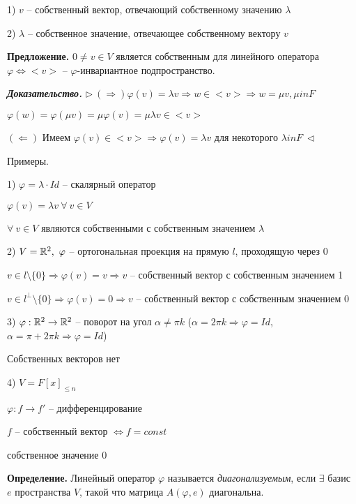 1) $v$ -- собственный вектор, отвечающий собственному значению $\lambda$

2) $\lambda$ -- собственное значение, отвечающее собственному вектору $v$

\vspace{\baselineskip}
\textbf{Предложение.} $0 \neq v \in V$ является собственным для линейного оператора $\varphi \Leftrightarrow <v>$ -- $\varphi$-инвариантное подпространство.

\vspace{\baselineskip}
\textbf{\textit{Доказательство.}} $\rhd \ (\Rightarrow) \varphi(v) = \lambda v \Rightarrow w \in <v> \Rightarrow w = \mu v, \mu in F$

$\varphi(w) = \varphi(\mu v) = \mu \varphi(v) = \mu \lambda v \in <v>$

$(\Leftarrow)$ Имеем $\varphi(v) \in <v> \Rightarrow \varphi(v) = \lambda v$ для некоторого $\lambda in F \ \lhd$

\vspace{\baselineskip}
Примеры.

1) $\varphi = \lambda \cdot Id$ -- скалярный оператор

$\varphi(v) = \lambda v \ \forall \ v \in V$

$\forall \ v \in V$ являются собственными с собственным значением $\lambda$

2) $V = \mathbb{R}^2, \ \varphi$ -- ортогональная проекция на прямую $l$, проходящую через 0

$v \in l \setminus \{0\} \Rightarrow \varphi(v) = v \Rightarrow v$ -- собственный вектор с собственным значением 1

$v \in l^{\bot} \setminus \{0\} \Rightarrow \varphi(v) = 0 \Rightarrow v$ -- собственный вектор с собственным значением 0

3) $\varphi: \mathbb{R}^2 \rightarrow \mathbb{R}^2$ -- поворот на угол $\alpha \neq \pi k$ ($\alpha = 2 \pi k \Rightarrow \varphi = Id$, $\alpha = \pi + 2 \pi k \Rightarrow \varphi = Id$)

Собственных векторов нет

4) $V = F[x]_{\leq n}$

$\varphi: f \rightarrow f'$ -- дифференцирование

$f$ -- собственный вектор $\Leftrightarrow f = const$

собственное значение 0

\vspace{\baselineskip}
\textbf{Определение.} Линейный оператор $\varphi$ называется \textit{диагонализуемым}, если $\exists$ базис $e$ пространства $V$, такой что матрица $A(\varphi, e)$ диагональна.

